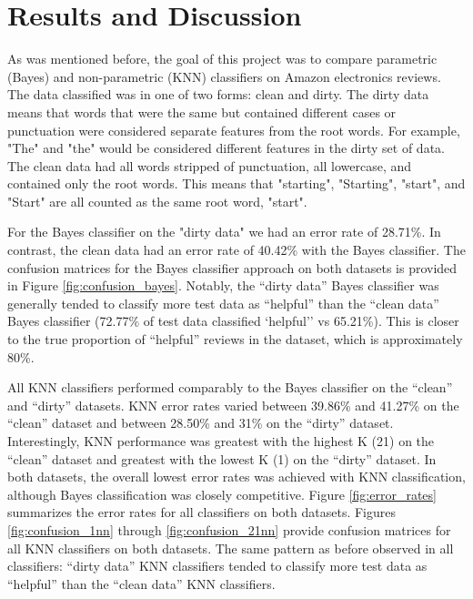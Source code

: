 \section{Results and Discussion}











As was mentioned before, the goal of this project was to compare parametric (Bayes) and non-parametric (KNN) classifiers on Amazon electronics reviews.
The data classified was in one of two forms: clean and dirty.
The dirty data means that words that were the same but contained different cases or punctuation were considered separate features from the root words.
For example, "The" and "the" would be considered different features in the dirty set of data.
The clean data had all words stripped of punctuation, all lowercase, and contained only the root words.
This means that "starting", "Starting", "start", and "Start" are all counted as the same root word, "start". 

For the Bayes classifier on the "dirty data" we had an error rate of 28.71\%.
In contrast, the clean data had an error rate of 40.42\% with the Bayes classifier.
The confusion matrices for the Bayes classifier approach on both datasets is provided in Figure \ref{fig:confusion_bayes}.
Notably, the ``dirty data'' Bayes classifier was generally tended to classify more test data as ``helpful'' than  the ``clean data'' Bayes classifier (72.77\% of test data classified `helpful'' vs 65.21\%).
This is closer to the true proportion of ``helpful'' reviews in the dataset, which is approximately 80\%.

All KNN classifiers performed comparably to the Bayes classifier on the ``clean'' and ``dirty'' datasets.
KNN error rates varied between 39.86\% and 41.27\% on the ``clean'' dataset and between 28.50\% and 31\% on the ``dirty'' dataset.
Interestingly, KNN performance was greatest with the highest K (21) on the ``clean'' dataset and greatest with the lowest K (1) on the ``dirty'' dataset.
In both datasets, the overall lowest error rates was achieved with KNN classification, although Bayes classification was closely competitive.
Figure \ref{fig:error_rates} summarizes the error rates for all classifiers on both datasets.
Figures \ref{fig:confusion_1nn} through \ref{fig:confusion_21nn} provide confusion matrices for all KNN classifiers on both datasets.
The same pattern as before observed in all classifiers: ``dirty data'' KNN classifiers tended to classify more test data as ``helpful'' than the ``clean data'' KNN classifiers.

